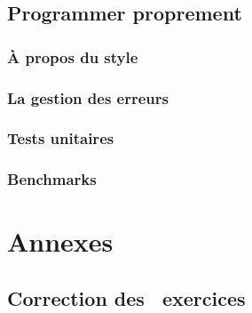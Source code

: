 \documentclass{minitelreport}
\newcounter{exercisescounter}
\begin{document}
\begin{refsection}
	\chapter{Programmer proprement}
	\label{chap:programmer_proprement}
		\section{À propos du style}
			\label{sec:_propos_du_style}
			
		\section{La gestion des erreurs}
			\label{sec:la_gestion_des_erreurs}
			
		\section{Tests unitaires}
			\label{sec:tests_unitaires}
			
		\section{Benchmarks}
			\label{sec:benchmarks}
				
\part{Annexes}
\label{part:annexes}
	\chapter{Correction des \theexercisescounter\ exercices}
	\label{chap:correction_exercices}
		


\printbibheading
\printbibliography[type=book,heading=subbibliography,title={Livres}]
\printbibliography[type=manual, heading=subbibliography, title={Manuels et documentation}]
\printbibliography[type=online, heading=subbibliography, title={Autres liens}]
\end{refsection}
\end{document}
